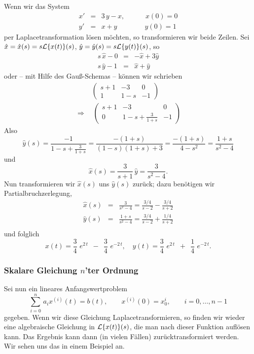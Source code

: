 \begin{bspX}
Wenn wir das System
\begin{eqnarray*}
x' & = & 3\,y-x,\qquad\quad x(0)=0\\
y' & = & x+y\qquad\qquad y(0)=1
\end{eqnarray*}
per Laplacetransformation l\"osen m\"ochten, so transformieren wir beide Zeilen.
Sei $\hat x =\hat x(s) = s{\cal L}\{x(t)\}(s)$, 
$\hat y =\hat y(s) = s{\cal L}\{y(t)\}(s)$, so
\begin{eqnarray*}
s\,\hat x-0 &=& -\hat x + 3 \hat y\\
s\,\hat y-1 &=& \hat x + \hat y
\end{eqnarray*}
oder -- mit Hilfe des Gau\ss{}-Schemas -- k\"onnen wir schrieben
\begin{eqnarray*}
\,\,\qquad\left(\begin{array}{cc|c}
s+1 & -3 & 0\\
1 & 1-s & -1
\end{array}\right)\\
\Rightarrow\quad\left(\begin{array}{cc|c}
s+1 & -3 & 0\\
0 & 1-s+\frac 3 {1+s} & -1
\end{array}\right)
\end{eqnarray*}
Also
$$ \hat y(s) = \frac {-1}{1-s+\frac 3 {1+s}} 
= \frac{-(1+s)}{(1-s)(1+s)+3}
= \frac{-(1+s)}{4-s^2}
= \frac{1+s}{s^2-4}
$$
und 
$$ \hat x(s) = \frac{3}{s+1}\, \hat y = \frac{3}{s^2-4}.$$
Nun transformieren wir $\hat x(s)$ uns $\hat y(s)$ zur\"uck; dazu ben\"otigen wir
Partialbruchzerlegung, 
\begin{eqnarray*}
\hat x(s) &=& \frac{3}{s^2-4} = \frac{3/4}{s-2}-\frac{3/4}{s+2}\\
\hat y(s) &=& \frac{1+s}{s^2-4} = \frac{3/4}{s-2}+\frac{1/4}{s+2}\\
\end{eqnarray*}
und folglich
$$
x(t) = \frac 3 4 \,\,e^{2\,t}\,\,\,-\,\,\,\frac 3 4 \,\,e^{-2\,t},\quad
y(t) = \frac 3 4 \,\,e^{2\,t}\,\,\,+\,\,\,\frac 1 4 \,\,e^{-2\,t}.
$$
\end{bspX}

\subsubsection{Skalare Gleichung $n$'ter Ordnung}
Sei nun ein lineares Anfangswertproblem
$$ \sum_{i=0}^n\, a_i x^{(i)}(t) = b(t),\qquad x^{(i)}(0)=x_0^i, \qquad i=0,\ldots, n-1$$
gegeben. Wenn wir diese Gleichung Laplacetransformieren, so finden wir wieder eine
algebraische Gleichung in ${\cal L}\{x(t)\}(s)$, die man nach dieser Funktion aufl\"osen
kann. Das Ergebnis kann dann (in vielen F\"allen) zur\"ucktransformiert werden. Wir 
sehen uns das in einem Beispiel an.

